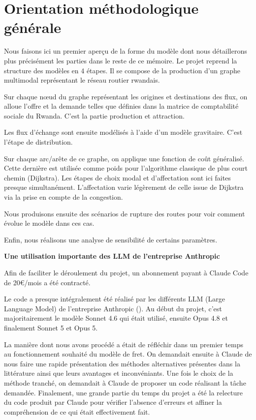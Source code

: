\documentclass[12pt,a4paper,french]{report}
\begin{document}
	\section{Orientation méthodologique générale}
	\label{sec:methodo_gene}
	
	Nous faisons ici un premier aperçu de la forme du modèle dont nous détaillerons plus précisément les parties dans le reste de ce mémoire. Le projet reprend la structure des modèles en 4 étapes. Il se compose de la production d'un graphe multimodal représentant le réseau routier rwandais. 
	
	Sur chaque nœud du graphe représentant les origines et destinations des flux, on alloue l'offre et la demande telles que définies dans la matrice de comptabilité sociale du Rwanda. C'est la partie production et attraction. 
	
	Les flux d'échange sont ensuite modélisés à l'aide d'un modèle gravitaire. C'est l'étape de distribution. 
	
	Sur chaque arc/arête de ce graphe, on applique une fonction de coût généralisé. Cette dernière est utilisée comme poids pour l'algorithme classique de plus court chemin (Dijkstra). Les étapes de choix modal et d'affectation sont ici faites presque simultanément. L'affectation varie légèrement de celle issue de Dijkstra via la prise en compte de la congestion. 
	
	Nous produisons ensuite des scénarios de rupture des routes pour voir comment évolue le modèle dans ces cas.
	
	Enfin, nous réalisons une analyse de sensibilité de certains paramètres.
	
	\medskip
	\medskip
	
	\textbf{Une utilisation importante des LLM de l'entreprise Anthropic}
	
	\medskip
	
	Afin de faciliter le déroulement du projet, un abonnement payant à Claude Code de 20€/mois a été contracté.
	
	Le code a presque intégralement été réalisé par les différents LLM (Large Language Model) de l'entreprise Anthropic (\cite{Anthropic2026Claude}). Au début du projet, c'est majoritairement le modèle Sonnet 4.6 qui était utilisé, ensuite Opus 4.8 et finalement Sonnet 5 et Opus 5.
	
	La manière dont nous avons procédé a était de réfléchir dans un premier temps au fonctionnement souhaité du modèle de fret. On demandait ensuite à Claude de nous  faire une rapide présentation des méthodes alternatives présentes dans la littérature ainsi que leurs avantages et inconvéniants. Une fois le choix de la méthode tranché, on demandait à Claude de proposer un code réalisant la tâche demandée. Finalement, une grande partie du temps du projet a été la relecture du code produit par Claude pour vérifier l'absence d'erreurs et affiner la compréhension de ce qui était effectivement fait.
	
\end{document}

